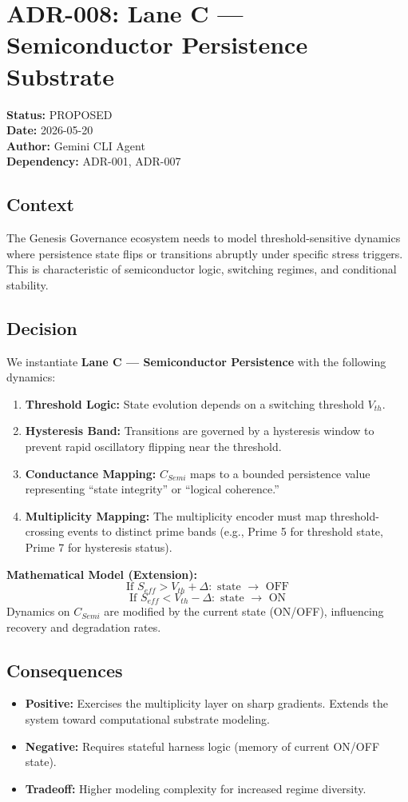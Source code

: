 \documentclass[11pt]{article}
\begin{document}
\section{ADR-008: Lane C — Semiconductor Persistence Substrate}
\textbf{Status:} PROPOSED \\
\textbf{Date:} 2026-05-20 \\
\textbf{Author:} Gemini CLI Agent \\
\textbf{Dependency:} ADR-001, ADR-007

\subsection{Context}
The Genesis Governance ecosystem needs to model threshold-sensitive dynamics where persistence state flips or transitions abruptly under specific stress triggers. This is characteristic of semiconductor logic, switching regimes, and conditional stability.

\subsection{Decision}
We instantiate \textbf{Lane C — Semiconductor Persistence} with the following dynamics:

\begin{enumerate}
    \item \textbf{Threshold Logic:} State evolution depends on a switching threshold $V_{th}$.
    \item \textbf{Hysteresis Band:} Transitions are governed by a hysteresis window to prevent rapid oscillatory flipping near the threshold.
    \item \textbf{Conductance Mapping:} $C_{Semi}$ maps to a bounded persistence value representing ``state integrity'' or ``logical coherence.''
    \item \textbf{Multiplicity Mapping:} The multiplicity encoder must map threshold-crossing events to distinct prime bands (e.g., Prime 5 for threshold state, Prime 7 for hysteresis status).
\end{enumerate}

\textbf{Mathematical Model (Extension):}
\[
\text{If } S_{eff} > V_{th} + \Delta : \text{ state } \to \text{ OFF}
\]
\[
\text{If } S_{eff} < V_{th} - \Delta : \text{ state } \to \text{ ON}
\]
Dynamics on $C_{Semi}$ are modified by the current state (ON/OFF), influencing recovery and degradation rates.

\subsection{Consequences}
\begin{itemize}
    \item \textbf{Positive:} Exercises the multiplicity layer on sharp gradients. Extends the system toward computational substrate modeling.
    \item \textbf{Negative:} Requires stateful harness logic (memory of current ON/OFF state).
    \item \textbf{Tradeoff:} Higher modeling complexity for increased regime diversity.
\end{itemize}
\end{document}
